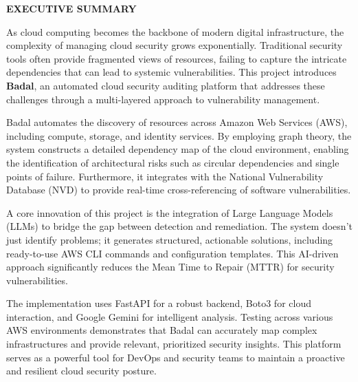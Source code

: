 \begin{center}
	\Large{\textbf{EXECUTIVE SUMMARY}}	
\end{center}
\vspace{1em}
\normalsize
\hspace{1cm} 
As cloud computing becomes the backbone of modern digital infrastructure, the complexity of managing cloud security grows exponentially. Traditional security tools often provide fragmented views of resources, failing to capture the intricate dependencies that can lead to systemic vulnerabilities. This project introduces \textbf{Badal}, an automated cloud security auditing platform that addresses these challenges through a multi-layered approach to vulnerability management.

Badal automates the discovery of resources across Amazon Web Services (AWS), including compute, storage, and identity services. By employing graph theory, the system constructs a detailed dependency map of the cloud environment, enabling the identification of architectural risks such as circular dependencies and single points of failure. Furthermore, it integrates with the National Vulnerability Database (NVD) to provide real-time cross-referencing of software vulnerabilities.

A core innovation of this project is the integration of Large Language Models (LLMs) to bridge the gap between detection and remediation. The system doesn't just identify problems; it generates structured, actionable solutions, including ready-to-use AWS CLI commands and configuration templates. This AI-driven approach significantly reduces the Mean Time to Repair (MTTR) for security vulnerabilities.

The implementation uses FastAPI for a robust backend, Boto3 for cloud interaction, and Google Gemini for intelligent analysis. Testing across various AWS environments demonstrates that Badal can accurately map complex infrastructures and provide relevant, prioritized security insights. This platform serves as a powerful tool for DevOps and security teams to maintain a proactive and resilient cloud security posture.
